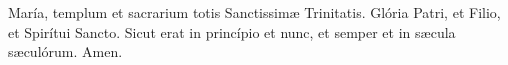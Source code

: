 María, templum et sacrarium totis Sanctissim{\ae} Trinitatis. Glória Patri, et Filio, et Spirítui Sancto. 
Sicut erat in princípio et nunc, et semper et in s{\ae}cula s{\ae}culórum. Amen.